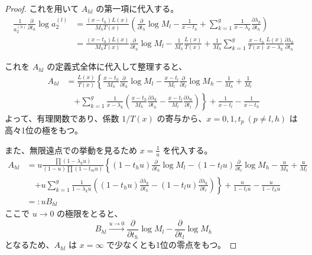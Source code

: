 \begin{story}
\begin{proof}
これを用いて $A_{hl}$ の第一項に代入する。
\begin{align*}
    \frac{1}{a_2^{(h)}} \frac{\partial}{\partial t_h} \log a_2^{(l)} 
    &= \frac{(x-t_h)L(x)}{M_h T(x)} \left( \frac{\partial}{\partial t_h} \log M_l - \frac{1}{x-t_h} + \sum_{k=1}^g \frac{1}{x-\lambda_k} \frac{\partial \lambda_k}{\partial t_h} \right) \\
    &= \frac{(x-t_h)L(x)}{M_h T(x)} \frac{\partial}{\partial t_h} \log M_l - \frac{1}{M_h} \frac{L(x)}{T(x)} + \frac{1}{M_h} \sum_{k=1}^g \frac{x-t_h}{T(x)} \frac{L(x)}{x-\lambda_k} \frac{\partial \lambda_k}{\partial t_h}
\end{align*}

これを $A_{hl}$ の定義式全体に代入して整理すると、
\begin{align*}
    A_{hl} &= \frac{L(x)}{T(x)} \left\{ \frac{x-t_h}{M_h} \frac{\partial}{\partial t_h} \log M_l - \frac{x-t_l}{M_l} \frac{\partial}{\partial t_l} \log M_h - \frac{1}{M_h} + \frac{1}{M_l} \right. \\
    &\quad \left. + \sum_{k=1}^g \frac{1}{x-\lambda_k} \left( \frac{x-t_h}{M_h} \frac{\partial \lambda_k}{\partial t_h} - \frac{x-t_l}{M_l} \frac{\partial \lambda_k}{\partial t_l} \right) \right\} + \frac{1}{x-t_l} - \frac{1}{x-t_h}
\end{align*}
よって、有理関数であり、係数 $1/T(x)$ の寄与から、$x=0, 1, t_p\ (p \neq l,h)$ は高々1位の極をもつ。

また、無限遠点での挙動を見るため $x=\frac{1}{u}$ を代入する。
\begin{align*}
    A_{hl} &= u \frac{\prod (1-\lambda_k u)}{(1-u) \prod (1-t_m u)} \left\{ (1-t_h u) \frac{\partial}{\partial t_h} \log M_l - (1-t_l u) \frac{\partial}{\partial t_l} \log M_h - \frac{u}{M_h} + \frac{u}{M_l} \right. \\
    &\quad \left. + u \sum_{k=1}^g \frac{1}{1-\lambda_k u} \left( (1-t_h u) \frac{\partial \lambda_k}{\partial t_h} - (1-t_l u) \frac{\partial \lambda_k}{\partial t_l} \right) \right\} + \frac{u}{1-t_l u} - \frac{u}{1-t_h u} \\
    &=: u B_{hl}
\end{align*}
ここで $u \to 0$ の極限をとると、
\begin{equation*}
    B_{hl} \xrightarrow{u \to 0} \frac{\partial}{\partial t_h} \log M_l - \frac{\partial}{\partial t_l} \log M_h
\end{equation*}
となるため、$A_{hl}$ は $x=\infty$ で少なくとも1位の零点をもつ。
\end{proof}
\end{story}

